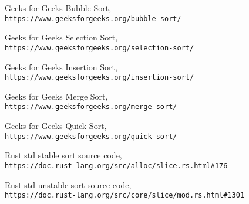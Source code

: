 \documentclass[12pt,letterpaper]{report}
\begin{document}
\begin{thebibliography}{9}

Geeks for Geeks Bubble Sort,
\\\texttt{https://www.geeksforgeeks.org/bubble-sort/}

Geeks for Geeks Selection Sort,
\\\texttt{https://www.geeksforgeeks.org/selection-sort/}

Geeks for Geeks Insertion Sort,
\\\texttt{https://www.geeksforgeeks.org/insertion-sort/}

Geeks for Geeks Merge Sort,
\\\texttt{https://www.geeksforgeeks.org/merge-sort/}

Geeks for Geeks Quick Sort,
\\\texttt{https://www.geeksforgeeks.org/quick-sort/}
 
Rust std stable sort source code,
\\\texttt{https://doc.rust-lang.org/src/alloc/slice.rs.html\#176}

Rust std unstable sort source code,
\\\texttt{https://doc.rust-lang.org/src/core/slice/mod.rs.html\#1301}



\end{thebibliography}
\end{document}
